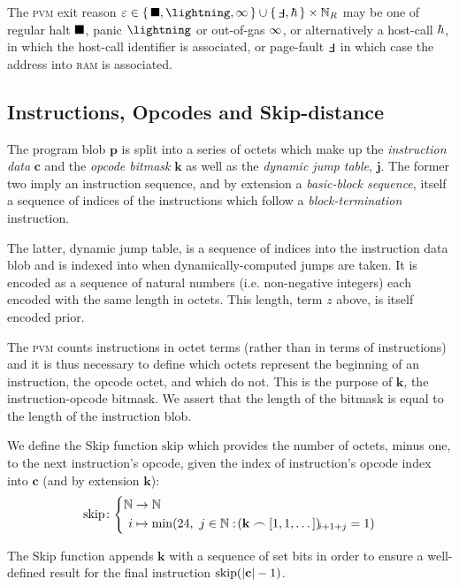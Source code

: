 The \textsc{pvm} exit reason $\varepsilon \in \set{\halt, \panic, \oog} \cup \set{\fault, \host} \times \pvmreg$ may be one of regular halt $\blacksquare$, panic $\panic$ or out-of-gas $\infty$, or alternatively a host-call $\hbar$, in which the host-call identifier is associated, or page-fault $\fault$ in which case the address into \textsc{ram} is associated.

\subsection{Instructions, Opcodes and Skip-distance}

The program blob $\mathbf{p}$ is split into a series of octets which make up the \emph{instruction data} $\mathbf{c}$ and the \emph{opcode bitmask} $\mathbf{k}$ as well as the \emph{dynamic jump table}, $\mathbf{j}$. The former two imply an instruction sequence, and by extension a \emph{basic-block sequence}, itself a sequence of indices of the instructions which follow a \emph{block-termination} instruction.

The latter, dynamic jump table, is a sequence of indices into the instruction data blob and is indexed into when dynamically-computed jumps are taken. It is encoded as a sequence of natural numbers (i.e. non-negative integers) each encoded with the same length in octets. This length, term $z$ above, is itself encoded prior.

The \textsc{pvm} counts instructions in octet terms (rather than in terms of instructions) and it is thus necessary to define which octets represent the beginning of an instruction, \ie the opcode octet, and which do not. This is the purpose of $\mathbf{k}$, the instruction-opcode bitmask. We assert that the length of the bitmask is equal to the length of the instruction blob.

\newcommand{\Fskip}{\text{skip}}

We define the Skip function $\Fskip$ which provides the number of octets, minus one, to the next instruction's opcode, given the index of instruction's opcode index into $\mathbf{c}$ (and by extension $\mathbf{k}$):
\begin{equation}
  \Fskip\colon\abracegroup{
    \N &\to \N\\
    i &\mapsto \min(24,\ j \in \N : \tup{\mathbf{k} \concat \sq{1, 1, \dots}}_{i + 1 + j} = 1)
  }
\end{equation}

The Skip function appends $\mathbf{k}$ with a sequence of set bits in order to ensure a well-defined result for the final instruction $\Fskip(\len{\mathbf{c}} - 1)$.

